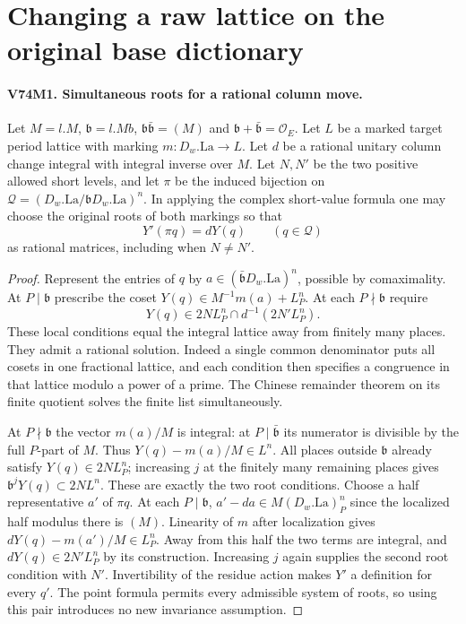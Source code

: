 \section{Changing a raw lattice on the original base dictionary}

\paragraph{V74M1. Simultaneous roots for a rational column move.}
\label{claim:V74M1}
Let $M=l.M$, $\mathfrak b=l.Mb$,
$\mathfrak b\bar{\mathfrak b}=(M)$ and
$\mathfrak b+\bar{\mathfrak b}=\mathcal O_E$. Let $L$ be a marked
target period lattice with marking $m:D_w.\mathrm{La}\to L$.
Let $d$ be a rational unitary column change integral with integral
inverse over $M$. Let $N,N'$ be the two positive allowed short
levels, and let $\pi$ be the induced bijection on
$\mathcal Q=(D_w.\mathrm{La}/\mathfrak bD_w.\mathrm{La})^n$.
In applying the complex short-value formula one may choose the
original roots of both markings so that
\[
                  Y'(\pi q)=dY(q)\qquad(q\in\mathcal Q)
\]
as rational matrices, including when $N\ne N'$.

\begin{proof}
Represent the entries of $q$ by
$a\in(\bar{\mathfrak b}D_w.\mathrm{La})^n$, possible by
comaximality. At $P\mid\mathfrak b$ prescribe the coset
$Y(q)\in M^{-1}m(a)+L_P^n$.
At each $P\nmid\mathfrak b$ require
\[
       Y(q)\in 2N L_P^n\cap d^{-1}(2N'L_P^n).
\]
These local conditions equal the integral lattice away from
finitely many places. They admit a rational solution. Indeed a
single common denominator puts all cosets in one fractional
lattice, and each condition then specifies a congruence in that
lattice modulo a power of a prime. The Chinese remainder theorem
on its finite quotient solves the finite list simultaneously.

At $P\nmid\mathfrak b$ the vector $m(a)/M$ is integral: at
$P\mid\bar{\mathfrak b}$ its numerator is divisible by the full
$P$-part of $M$. Thus $Y(q)-m(a)/M\in L^n$. All places outside
$\mathfrak b$ already satisfy $Y(q)\in 2N L_P^n$;
increasing $j$ at the finitely many remaining places gives
$\mathfrak b^jY(q)\subset 2N L^n$. These are exactly the two
root conditions. Choose a half representative $a'$ of $\pi q$.
At each $P\mid\mathfrak b$, $a'-da\in M(D_w.\mathrm{La})_P^n$
since the localized half modulus there is $(M)$. Linearity of $m$
after localization gives $dY(q)-m(a')/M\in L_P^n$. Away from
this half the two terms are integral, and $dY(q)\in 2N'L_P^n$
by its construction. Increasing $j$ again supplies the second
root condition with $N'$. Invertibility of the residue action
makes $Y'$ a definition for every $q'$. The point formula permits
every admissible system of roots, so using this pair introduces
no new invariance assumption.
\end{proof}

